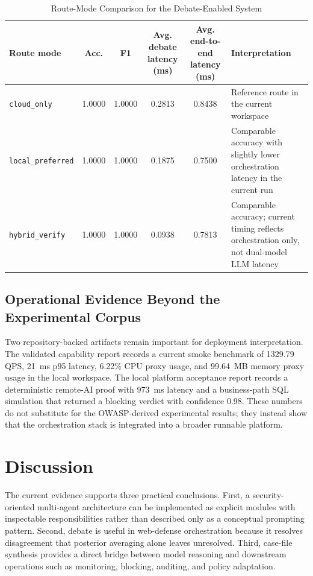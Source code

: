 \documentclass{ieeeaccess}
\begin{document}
\begin{table}[!t]
\caption{Route-Mode Comparison for the Debate-Enabled System}
\label{tab:route-modes}
\centering
\small
\begin{tabularx}{\textwidth}{lccccY}
\toprule
\textbf{Route mode} & \textbf{Acc.} & \textbf{F1} & \textbf{Avg. debate latency (ms)} & \textbf{Avg. end-to-end latency (ms)} & \textbf{Interpretation} \\
\midrule
\texttt{cloud\_only} & 1.0000 & 1.0000 & 0.2813 & 0.8438 & Reference route in the current workspace \\
\texttt{local\_preferred} & 1.0000 & 1.0000 & 0.1875 & 0.7500 & Comparable accuracy with slightly lower orchestration latency in the current run \\
\texttt{hybrid\_verify} & 1.0000 & 1.0000 & 0.0938 & 0.7813 & Comparable accuracy; current timing reflects orchestration only, not dual-model LLM latency \\
\bottomrule
\end{tabularx}
\end{table}

\subsection{Operational Evidence Beyond the Experimental Corpus}
Two repository-backed artifacts remain important for deployment interpretation. The validated capability report records a current smoke benchmark of 1329.79 QPS, 21~ms p95 latency, 6.22\% CPU proxy usage, and 99.64~MB memory proxy usage in the local workspace. The local platform acceptance report records a deterministic remote-AI proof with 973~ms latency and a business-path SQL simulation that returned a blocking verdict with confidence 0.98. These numbers do not substitute for the OWASP-derived experimental results; they instead show that the orchestration stack is integrated into a broader runnable platform.

\section{Discussion}
\label{sec:discussion}

The current evidence supports three practical conclusions. First, a security-oriented multi-agent architecture can be implemented as explicit modules with inspectable responsibilities rather than described only as a conceptual prompting pattern. Second, debate is useful in web-defense orchestration because it resolves disagreement that posterior averaging alone leaves unresolved. Third, case-file synthesis provides a direct bridge between model reasoning and downstream operations such as monitoring, blocking, auditing, and policy adaptation.
\end{document}
